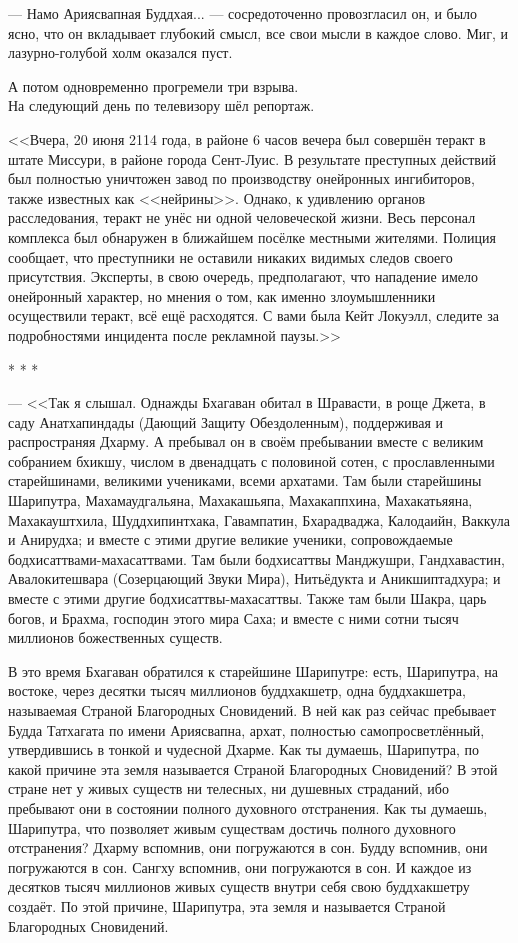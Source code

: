 \documentclass[openany, oneside]{book}
\begin{document}
--- Намо Ариясвапная Буддхая... --- сосредоточенно провозгласил он, и было ясно, что он вкладывает глубокий смысл, все свои мысли в каждое слово. Миг, и лазурно-голубой холм оказался пуст.

А потом одновременно прогремели три взрыва.\\

На следующий день по телевизору шёл репортаж.

<<Вчера, 20 июня 2114 года, в районе 6 часов вечера был совершён теракт в штате Миссури, в районе города Сент-Луис. В результате преступных действий был полностью уничтожен завод по производству онейронных ингибиторов, также известных как <<нейрины>>. Однако, к удивлению органов расследования, теракт не унёс ни одной человеческой жизни. Весь персонал комплекса был обнаружен в ближайшем посёлке местными жителями. Полиция сообщает, что преступники не оставили никаких видимых следов своего присутствия. Эксперты, в свою очередь, предполагают, что нападение имело онейронный характер, но мнения о том, как именно злоумышленники осуществили теракт, всё ещё расходятся. С вами была Кейт Локуэлл, следите за подробностями инцидента после рекламной паузы.>>

\begin{center}
    * * *
\end{center}

--- <<Так я слышал. Однажды Бхагаван обитал в Шравасти, в роще Джета, в саду Анатхапиндады (Дающий Защиту Обездоленным), поддерживая и распространяя Дхарму. А пребывал он в своём пребывании вместе с великим собранием бхикшу, числом в двенадцать с половиной сотен, с прославленными старейшинами, великими учениками, всеми архатами. Там были старейшины Шарипутра, Махамаудгальяна, Махакашьяпа, Махакаппхина, Махакатьяяна, Махакауштхила, Шуддхипинтхака, Гавампатин, Бхарадваджа, Калодаийн, Ваккула и Анирудха; и вместе с этими другие великие ученики, сопровождаемые бодхисаттвами-махасаттвами. Там были бодхисаттвы Манджушри, Гандхавастин, Авалокитешвара (Созерцающий Звуки Мира), Нитьёдукта и Аникшиптадхура; и вместе с этими другие бодхисаттвы-махасаттвы. Также там были Шакра, царь богов, и Брахма, господин этого мира Саха; и вместе с ними сотни тысяч миллионов божественных существ.

В это время Бхагаван обратился к старейшине Шарипутре: есть, Шарипутра, на востоке, через десятки тысяч миллионов буддхакшетр, одна буддхакшетра, называемая Страной Благородных Сновидений. В ней как раз сейчас пребывает Будда Татхагата по имени Ариясвапна, архат, полностью самопросветлённый, утвердившись в тонкой и чудесной Дхарме. Как ты думаешь, Шарипутра, по какой причине эта земля называется Страной Благородных Сновидений? В этой стране нет у живых существ ни телесных, ни душевных страданий, ибо пребывают они в состоянии полного духовного отстранения. Как ты думаешь, Шарипутра, что позволяет живым существам достичь полного духовного отстранения? Дхарму вспомнив, они погружаются в сон. Будду вспомнив, они погружаются в сон. Сангху вспомнив, они погружаются в сон. И каждое из десятков тысяч миллионов живых существ внутри себя свою буддхакшетру создаёт. По этой причине, Шарипутра, эта земля и называется Страной Благородных Сновидений.
\end{document}

